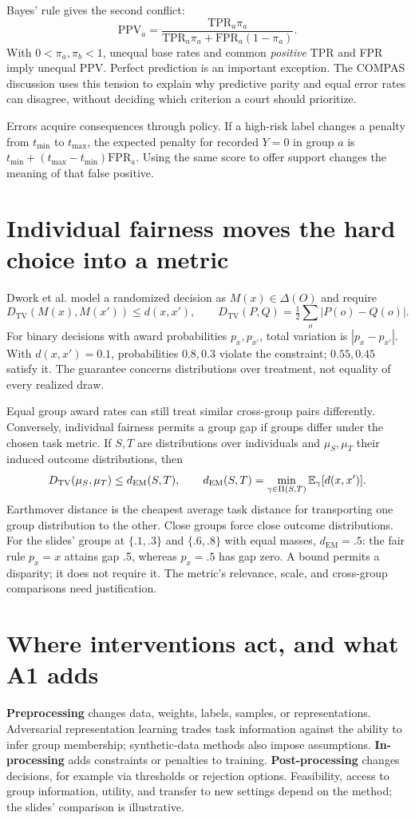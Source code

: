 \documentclass[11pt,letterpaper]{article}
\begin{document}
Bayes' rule gives the second conflict:
\[
\mathrm{PPV}_a=
\frac{\mathrm{TPR}_a\pi_a}
{\mathrm{TPR}_a\pi_a+\mathrm{FPR}_a(1-\pi_a)}.
\]
With $0<\pi_a,\pi_b<1$, unequal base rates and common \emph{positive} TPR and
FPR imply unequal PPV. Perfect prediction is an important exception. The COMPAS
discussion uses this tension to explain why predictive parity and equal error
rates can disagree, without deciding which criterion a court should prioritize.

Errors acquire consequences through policy. If a high-risk label changes a penalty
from $t_{\min}$ to $t_{\max}$, the expected penalty for recorded $Y=0$ in group
$a$ is $t_{\min}+(t_{\max}-t_{\min})\mathrm{FPR}_a$. Using the same score
to offer support changes the meaning of that false positive.

\newpage
\section*{Individual fairness moves the hard choice into a metric}
Dwork et al. model a randomized decision as $M(x)\in\Delta(O)$ and require
\[
D_{\mathrm{TV}}(M(x),M(x'))\le d(x,x'),\qquad
D_{\mathrm{TV}}(P,Q)=\tfrac12\sum_o|P(o)-Q(o)|.
\]
For binary decisions with award probabilities $p_x,p_{x'}$, total variation is
$|p_x-p_{x'}|$. With $d(x,x')=0.1$, probabilities $0.8,0.3$ violate the
constraint; $0.55,0.45$ satisfy it. The guarantee concerns distributions over
treatment, not equality of every realized draw.

Equal group award rates can still treat similar cross-group pairs differently.
Conversely, individual fairness permits a group gap if groups differ under the
chosen task metric. If $S,T$ are distributions over individuals and $\mu_S,\mu_T$
their induced outcome distributions, then
\[
D_{\mathrm{TV}}(\mu_S,\mu_T)\le d_{\mathrm{EM}}(S,T),\qquad
d_{\mathrm{EM}}(S,T)=\min_{\gamma\in\Pi(S,T)}\mathbb{E}_\gamma[d(x,x')].
\]
Earthmover distance is the cheapest average task distance for transporting one
group distribution to the other. Close groups force close outcome distributions.
For the slides' groups at $\{.1,.3\}$ and $\{.6,.8\}$ with equal masses,
$d_{\mathrm{EM}}=.5$: the fair rule $p_x=x$ attains gap .5, whereas $p_x=.5$
has gap zero. A bound permits a disparity; it does not require it.
The metric's relevance, scale, and cross-group comparisons need justification.

\section*{Where interventions act, and what A1 adds}
\textbf{Preprocessing} changes data, weights, labels, samples, or representations.
Adversarial representation learning trades task information against the ability
to infer group membership; synthetic-data methods also impose assumptions.
\textbf{In-processing} adds constraints or penalties to training.
\textbf{Post-processing} changes decisions, for example via thresholds or rejection
options. Feasibility, access to group information, utility, and transfer to new
settings depend on the method; the slides' comparison is illustrative.
\end{document}
